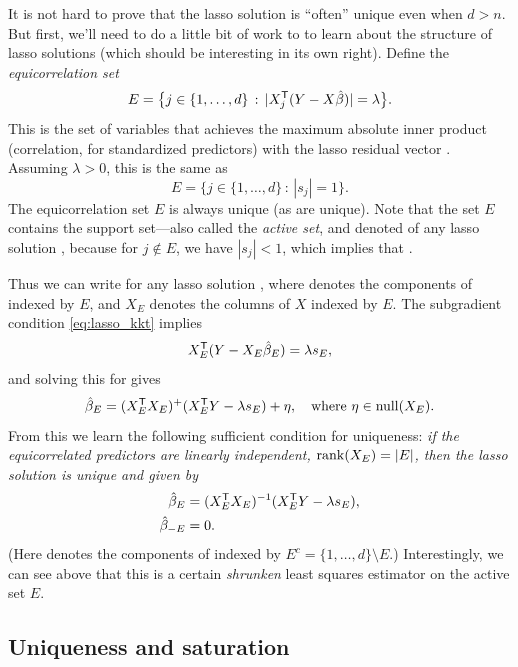 \documentclass{article}
\begin{document}
It is not hard to prove that the lasso solution is ``often'' unique even when $d
> n$. But first, we'll need to do a little bit of work to to learn about the
structure of lasso solutions (which should be interesting in its own right). 
Define the \emph{equicorrelation set}   
\[
E = \big\{ j \in \{1,\dots,d\} \,:\, |X_j^{\mathsf{T}} (Y - X\hat{\beta})| = \lambda \big\}.   
\]
This is the set of variables that achieves the maximum absolute inner product
(correlation, for standardized predictors) with the lasso residual vector
. Assuming $\lambda>0$, this is the same as 
\[
E = \big\{ j \in \{1,\dots,d\} \,:\, |s_j| = 1 \big\}. 
\]
The equicorrelation set $E$ is always unique (as  are
unique). Note that the set $E$ contains the support set---also called the
\emph{active set}, and denoted  of any lasso solution 
\smash{$\hbeta$}, because for $j \notin E$, we have $|s_j| < 1$, which implies
that  .   

Thus we can write  for any lasso solution
\smash{$\hbeta$}, where  denotes the components of
\smash{$\hbeta$} indexed by $E$, and $X_E$ denotes the columns of $X$ indexed by
$E$. The subgradient condition \eqref{eq:lasso_kkt} implies
\[
X_E^{\mathsf{T}} (Y - X_E \hat{\beta}_E) = \lambda s_E,
\]
and solving this for  gives  
\[
\hat{\beta}_E = (X_E^{\mathsf{T}} X_E)^+ (X_E^{\mathsf{T}} Y - \lambda s_E) + \eta, 
\quad \text{where $\eta \in \mathrm{null}(X_E)$}.
\]
From this we learn the following sufficient condition for uniqueness: \emph{if
  the equicorrelated predictors are linearly independent, $\mathrm{rank}(X_E) = |E|$,
  then the lasso solution is unique and given by}
\begin{equation}
\label{eq:lasso_unique}
\begin{aligned}
\hat{\beta}_E &= (X_E^{\mathsf{T}} X_E)^{-1} (X_E^{\mathsf{T}} Y - \lambda s_E), \\
\hat{\beta}_{-E} &= 0.
\end{aligned}
\end{equation}
(Here  denotes the components of \smash{$\hbeta$} indexed 
by $E^c = \{1,\dots,d\} \setminus E$.) Interestingly, we can see above that this
is a certain \emph{shrunken} least squares estimator on the active set $E$.    
 
\subsection{Uniqueness and saturation}
\end{document}

